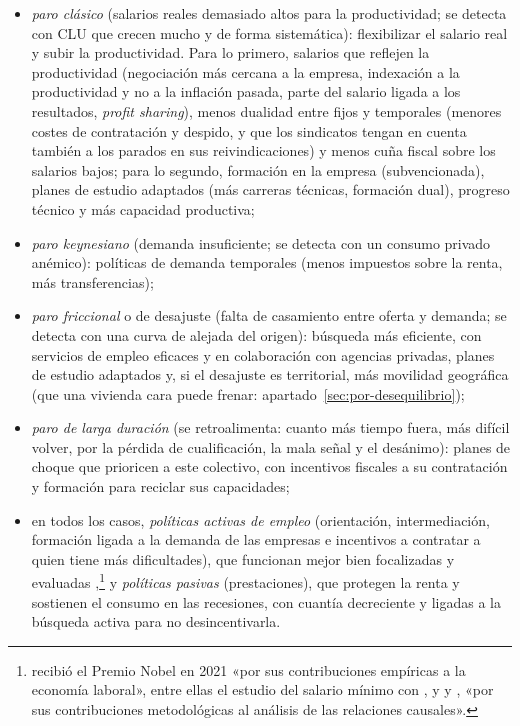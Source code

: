 \documentclass[11pt]{article}
\begin{document}
\begin{itemize}
  \begin{itemize}
  \item \emph{paro clásico} (salarios reales demasiado altos para la productividad; se detecta con CLU que crecen mucho y de forma sistemática): flexibilizar el salario real y subir la productividad. Para lo primero, salarios que reflejen la productividad (negociación más cercana a la empresa, indexación a la productividad y no a la inflación pasada, parte del salario ligada a los resultados, \emph{profit sharing}), menos dualidad entre fijos y temporales (menores costes de contratación y despido, y que los sindicatos tengan en cuenta también a los parados en sus reivindicaciones) y menos cuña fiscal sobre los salarios bajos; para lo segundo, formación en la empresa (subvencionada), planes de estudio adaptados (más carreras técnicas, formación dual), progreso técnico y más capacidad productiva;
  \item \emph{paro keynesiano} (demanda insuficiente; se detecta con un consumo privado anémico): políticas de demanda temporales (menos impuestos sobre la renta, más transferencias);
  \item \emph{paro friccional} o de desajuste (falta de casamiento entre oferta y demanda; se detecta con una curva de  alejada del origen): búsqueda más eficiente, con servicios de empleo eficaces y en colaboración con agencias privadas, planes de estudio adaptados y, si el desajuste es territorial, más movilidad geográfica (que una vivienda cara puede frenar: apartado~\ref{sec:por-desequilibrio});
  \item \emph{paro de larga duración} (se retroalimenta: cuanto más tiempo fuera, más difícil volver, por la pérdida de cualificación, la mala señal y el desánimo): planes de choque que prioricen a este colectivo, con incentivos fiscales a su contratación y formación para reciclar sus capacidades;
  \item en todos los casos, \emph{políticas activas de empleo} (orientación, intermediación, formación ligada a la demanda de las empresas e incentivos a contratar a quien tiene más dificultades), que funcionan mejor bien focalizadas y evaluadas \parencite{Card2018ALMP},\footnote{ recibió el Premio Nobel en 2021 «por sus contribuciones empíricas a la economía laboral», entre ellas el estudio del salario mínimo con , y  y , «por sus contribuciones metodológicas al análisis de las relaciones causales»\nocite{Nobel2021CardAngristImbens}.} y \emph{políticas pasivas} (prestaciones), que protegen la renta y sostienen el consumo en las recesiones, con cuantía decreciente y ligadas a la búsqueda activa para no desincentivarla.
  \end{itemize}
\end{itemize}
\end{document}
